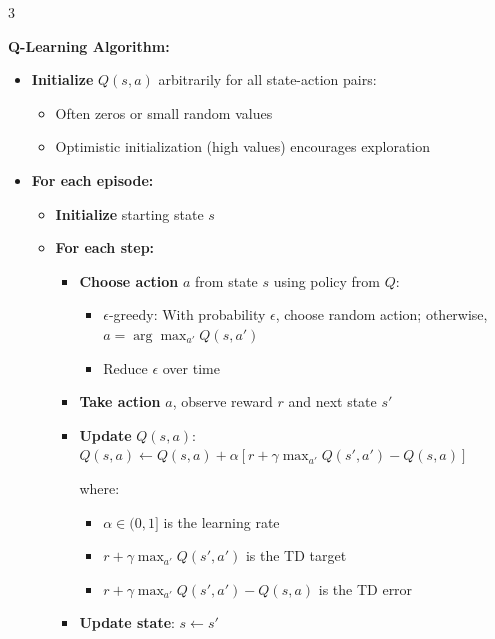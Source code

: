 \documentclass[10pt,landscape]{article}
\begin{document}
\begin{multicols}{3}
\begin{tcolorbox}[breakable, title=Reinforcement Learning, colback=rl, boxsep=1pt, left=1pt, right=1pt, top=1pt, bottom=1pt]
\textbf{Q-Learning Algorithm:}
\begin{itemize}[leftmargin=*,noitemsep,topsep=0pt]
    \item \textbf{Initialize} $Q(s,a)$ arbitrarily for all state-action pairs:
    \begin{itemize}[noitemsep]
        \item Often zeros or small random values
        \item Optimistic initialization (high values) encourages exploration
    \end{itemize}
    
    \item \textbf{For each episode:}
    \begin{itemize}[noitemsep]
        \item \textbf{Initialize} starting state $s$
        
        \item \textbf{For each step:}
        \begin{itemize}[noitemsep]
            \item \textbf{Choose action} $a$ from state $s$ using policy from $Q$:
            \begin{itemize}[noitemsep]
                \item $\epsilon$-greedy: With probability $\epsilon$, choose random action; otherwise, $a = \arg\max_{a'} Q(s,a')$
                \item Reduce $\epsilon$ over time
            \end{itemize}
            
            \item \textbf{Take action} $a$, observe reward $r$ and next state $s'$
            
            \item \textbf{Update} $Q(s,a)$:
            $Q(s,a) \leftarrow Q(s,a) + \alpha [r + \gamma \max_{a'} Q(s',a') - Q(s,a)]$
            
            where:
            \begin{itemize}[noitemsep]
                \item $\alpha \in (0,1]$ is the learning rate
                \item $r + \gamma \max_{a'} Q(s',a')$ is the TD target
                \item $r + \gamma \max_{a'} Q(s',a') - Q(s,a)$ is the TD error
            \end{itemize}
            
            \item \textbf{Update state}: $s \leftarrow s'$
        \end{itemize}
        

\end{itemize}
\end{itemize}
\end{tcolorbox}
\end{multicols}
\end{document}
